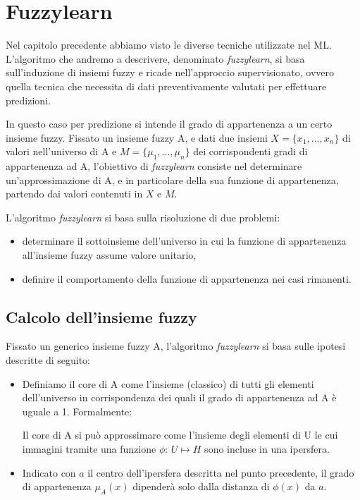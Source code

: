 \documentclass[12pt,italian]{report}
\begin{document}
\section{Fuzzylearn}

Nel capitolo precedente abbiamo visto le diverse tecniche utilizzate nel ML. L'algoritmo che andremo a descrivere, denominato \emph{fuzzylearn}\cite{fuzzylearn}, si basa sull'induzione di insiemi fuzzy e ricade nell'approccio supervisionato, ovvero quella tecnica che necessita di dati preventivamente valutati per effettuare predizioni.

In questo caso per predizione si intende il grado di appartenenza a un certo insieme fuzzy. 
Fissato un insieme fuzzy A, e dati due insiemi $ X = \{x_1, ..., x_n\} $ di valori nell'universo di A e $ M = \{\mu_1, ..., \mu_n\} $ dei corrispondenti gradi di appartenenza ad A, l'obiettivo di \emph{fuzzylearn}  consiste nel determinare un'approssimazione di A, e in particolare della sua funzione di appartenenza, partendo dai valori contenuti in $ X $ e $ M $.

L'algoritmo \emph{fuzzylearn} si basa sulla risoluzione di due problemi:
\begin{itemize}
	\item determinare il sottoinsieme dell'universo in cui la funzione di appartenenza all'insieme fuzzy assume valore unitario,
	\item definire il comportamento della funzione di appartenenza nei casi rimanenti.
\end{itemize}

\subsection {Calcolo dell'insieme fuzzy}
Fissato un generico insieme fuzzy A, l'algoritmo \emph{fuzzylearn} si basa sulle ipotesi descritte di seguito:
\begin{itemize}
	\item Definiamo il core di A come l'insieme (classico) di tutti gli elementi dell'universo in corrispondenza dei quali il grado di appartenenza ad A è uguale a 1. Formalmente:
	\begin{center}
	\end{center}
	Il core di A si può approssimare come l'insieme degli elementi di U le cui immagini tramite una funzione $ \phi $: $ U \mapsto H $ sono incluse in una ipersfera.
	
	\item Indicato con $ a $ il centro dell'ipersfera descritta nel punto precedente, il grado di appartenenza $ \mu_A(x) $ dipenderà solo dalla distanza di $ \phi(x) $ da $ a $.
\end{itemize}
\end{document}
